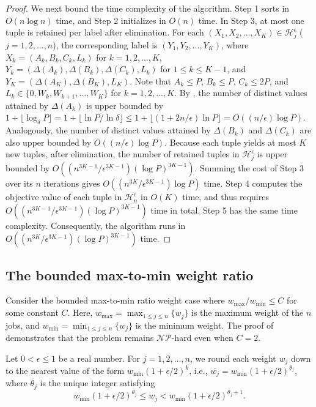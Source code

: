 ﻿\documentclass[12pt]{article} \textheight=24.5cm \textwidth=16.5cm \parskip = 0.165cm
\begin{document}
\begin{sloppypar}
\begin{proof}
        We next bound the time complexity of the algorithm.
        Step 1 sorts in $O(n\log n)$ time, and Step 2 initializes in $O(n)$ time.
        In Step 3, at most one tuple is retained per label after elimination.
        For each $(X_1, X_2, \ldots, X_K) \in \mathcal{H}_j^{\epsilon}$ ($j=1, 2, \ldots, n$), the corresponding label is  $(Y_1, Y_2, \ldots, Y_K)$, where $X_k=(A_k, B_k, C_k, L_k)$ for $k=1, 2, \ldots, K$, $Y_k=(\Delta(A_k), \Delta(B_k), \Delta(C_k), L_k)$ for $1 \leq k \leq K-1$, and $Y_K=(\Delta(A_K), \Delta(B_K), L_K)$.
        Note that $A_k \leq P$, $B_k \leq P$, $C_k \leq 2P$, and $L_k \in \{0, W_k, W_{k+1}, \ldots, W_K\}$ for $k=1, 2, \ldots, K$.
        By , the number of distinct values attained by $\Delta(A_k)$ is upper bounded by $1+\lfloor \log_{\delta} P \rfloor = 1+ \lfloor \ln P / \ln \delta \rfloor \leq 1+ \lfloor (1+2n/ \epsilon) \ln P \rfloor =O((n/ \epsilon) \log P)$.
        Analogously, the number of distinct values attained by $\Delta(B_k)$ and $\Delta(C_k)$ are also upper bounded by $O((n/\epsilon) \log P)$.
        Because each tuple yields at most $K$ new tuples, after elimination, the number of retained tuples in $\mathcal{H}_j^{\epsilon}$ is upper bounded by $O((n^{3K-1}/\epsilon^{3K-1}) (\log P)^{3K-1})$.
        Summing the cost of Step 3 over its $n$ iterations gives $O((n^{3K}/\epsilon^{3K-1}) \log P)$ time.
        Step 4 computes the objective value of each tuple in $\mathcal{H}_n^{\epsilon}$ in $O(K)$ time, and thus requires $O((n^{3K-1}/\epsilon^{3K-1}) (\log P)^{3K-1})$ time in total.
        Step 5 has the same time complexity.
        Consequently, the algorithm runs in $O((n^{3K}/\epsilon^{3K-1}) (\log P)^{3K-1})$ time.
        \end{proof}

        \subsection{The bounded max-to-min weight ratio} \label{sec:bounded_weight}

        Consider the bounded max-to-min ratio weight case where $w_{\max}/w_{\min} \leq C$ for some constant $C$.
        Here, $w_{\max}=\max_{1 \leq j \leq n} \{w_j\}$ is the maximum weight of the $n$ jobs, and $w_{\min}=\min_{1 \leq j \leq n} \{w_j\}$ is the minimum weight.
        The proof of  demonstrates that the problem remains $\mathcal{NP}$-hard even when $C=2$.

        Let $0 < \epsilon \leq 1$ be a real number.
        For $j=1, 2, \ldots, n$, we round each weight $w_j$ down to the nearest value of the form  $w_{\min}(1+\epsilon/2)^k$, i.e., $\overline{w_j}=w_{\min}(1+\epsilon/2)^{\theta_j}$, where $\theta_j$ is the unique integer satisfying
        \begin{equation} \label{eq-4.4-PTAS-1}
            w_{\min}(1+\epsilon/2)^{\theta_j} \leq w_j < w_{\min}(1+\epsilon/2)^{\theta_j+1}.
        \end{equation}



\end{sloppypar}
\end{document}
